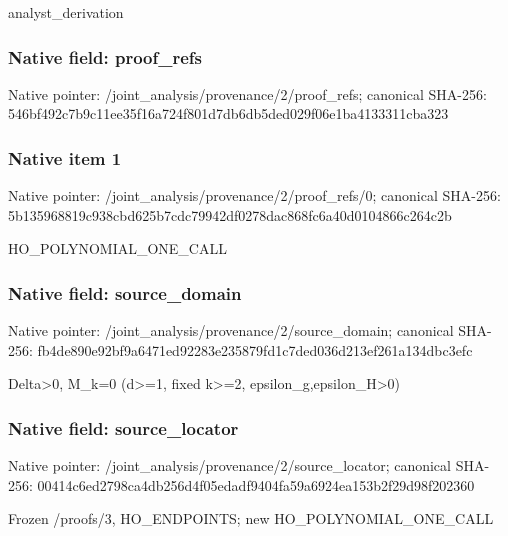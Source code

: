 \documentclass[10pt,a4paper]{article}
\begin{document}
\begingroup\raggedright\sloppy analyst\_\allowbreak{}derivation\par\endgroup

\subsubsection{Native field: proof\_\allowbreak{}refs}
Native pointer: /joint\_\allowbreak{}analysis/provenance/2/proof\_\allowbreak{}refs; canonical SHA-256: 546bf492c7b9c11ee35f16a724f801d7db6db5ded029f06e1ba4133311cba323

\subsubsection{Native item 1}
Native pointer: /joint\_\allowbreak{}analysis/provenance/2/proof\_\allowbreak{}refs/0; canonical SHA-256: 5b135968819c938cbd625b7cdc79942df0278dac868fc6a40d0104866c264c2b

\begingroup\raggedright\sloppy HO\_\allowbreak{}POLYNOMIAL\_\allowbreak{}ONE\_\allowbreak{}CALL\par\endgroup

\subsubsection{Native field: source\_\allowbreak{}domain}
Native pointer: /joint\_\allowbreak{}analysis/provenance/2/source\_\allowbreak{}domain; canonical SHA-256: fb4de890e92bf9a6471ed92283e235879fd1c7ded036d213ef261a134dbc3efc

\begingroup\raggedright\sloppy Delta>0,\allowbreak{} M\_\allowbreak{}k=\allowbreak{}0 (d>=\allowbreak{}1,\allowbreak{} fixed k>=\allowbreak{}2,\allowbreak{} epsilon\_\allowbreak{}g,\allowbreak{}epsilon\_\allowbreak{}H>0)\par\endgroup

\subsubsection{Native field: source\_\allowbreak{}locator}
Native pointer: /joint\_\allowbreak{}analysis/provenance/2/source\_\allowbreak{}locator; canonical SHA-256: 00414c6ed2798ca4db256d4f05edadf9404fa59a6924ea153b2f29d98f202360

\begingroup\raggedright\sloppy Frozen /\allowbreak{}proofs/\allowbreak{}3,\allowbreak{} HO\_\allowbreak{}ENDPOINTS;\allowbreak{} new HO\_\allowbreak{}POLYNOMIAL\_\allowbreak{}ONE\_\allowbreak{}CALL\par\endgroup
\end{document}
